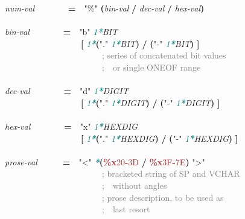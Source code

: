 \documentclass{article}
\begin{document}
{\emph{num-{}val}\mbox{~~~~~~~~}\textbf{=}\mbox{~~}\textcolor{BrickRed}{"\%{}"} \textbf{(}\emph{bin-{}val} \textbf{/} \emph{dec-{}val} \textbf{/} \emph{hex-{}val}\textbf{)}\\
\\
\emph{bin-{}val}\mbox{~~~~~~~~}\textbf{=}\mbox{~~}\textcolor{BrickRed}{"b"} \textcolor{teal}{\emph{1\textbf{*}}}\emph{BIT}\\
\mbox{~~~~~~~~~~~~~~~~~~}\textbf{[} \textcolor{teal}{\emph{1\textbf{*}}}\textbf{(}\textcolor{BrickRed}{"."} \textcolor{teal}{\emph{1\textbf{*}}}\emph{BIT}\textbf{)} \textbf{/} \textbf{(}\textcolor{BrickRed}{"-{}"} \textcolor{teal}{\emph{1\textbf{*}}}\emph{BIT}\textbf{)} \textbf{]}\\
\mbox{~~~~~~~~~~~~~~~~~~~~~~~}\textcolor{gray}{; series of concatenated bit values}\\
\mbox{~~~~~~~~~~~~~~~~~~~~~~~}\textcolor{gray}{;\mbox{~~}or single ONEOF range}\\
\\
\emph{dec-{}val}\mbox{~~~~~~~~}\textbf{=}\mbox{~~}\textcolor{BrickRed}{"d"} \textcolor{teal}{\emph{1\textbf{*}}}\emph{DIGIT}\\
\mbox{~~~~~~~~~~~~~~~~~~}\textbf{[} \textcolor{teal}{\emph{1\textbf{*}}}\textbf{(}\textcolor{BrickRed}{"."} \textcolor{teal}{\emph{1\textbf{*}}}\emph{DIGIT}\textbf{)} \textbf{/} \textbf{(}\textcolor{BrickRed}{"-{}"} \textcolor{teal}{\emph{1\textbf{*}}}\emph{DIGIT}\textbf{)} \textbf{]}\\
\\
\emph{hex-{}val}\mbox{~~~~~~~~}\textbf{=}\mbox{~~}\textcolor{BrickRed}{"x"} \textcolor{teal}{\emph{1\textbf{*}}}\emph{HEXDIG}\\
\mbox{~~~~~~~~~~~~~~~~~~}\textbf{[} \textcolor{teal}{\emph{1\textbf{*}}}\textbf{(}\textcolor{BrickRed}{"."} \textcolor{teal}{\emph{1\textbf{*}}}\emph{HEXDIG}\textbf{)} \textbf{/} \textbf{(}\textcolor{BrickRed}{"-{}"} \textcolor{teal}{\emph{1\textbf{*}}}\emph{HEXDIG}\textbf{)} \textbf{]}\\
\\
\emph{prose-{}val}\mbox{~~~~~~}\textbf{=}\mbox{~~}\textcolor{BrickRed}{"<"} \textcolor{teal}{\emph{\textbf{*}}}\textbf{(}\textcolor{Brown}{\textbf{\%{}x}20\textbf{-}3D} \textbf{/} \textcolor{Brown}{\textbf{\%{}x}3F\textbf{-}7E}\textbf{)} \textcolor{BrickRed}{">"}\\
\mbox{~~~~~~~~~~~~~~~~~~~~~~~}\textcolor{gray}{; bracketed string of SP and VCHAR}\\
\mbox{~~~~~~~~~~~~~~~~~~~~~~~}\textcolor{gray}{;\mbox{~~}without angles}\\
\mbox{~~~~~~~~~~~~~~~~~~~~~~~}\textcolor{gray}{; prose description, to be used as}\\
\mbox{~~~~~~~~~~~~~~~~~~~~~~~}\textcolor{gray}{;\mbox{~~}last resort}\\
\\

}
\end{document}

